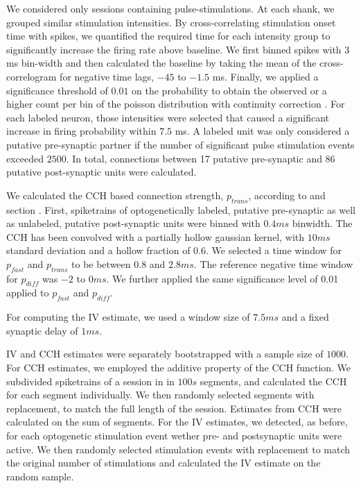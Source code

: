 \documentclass[11pt]{article}
\begin{document}
We considered only sessions containing pulse-stimulations.
At each shank, we grouped similar stimulation intensities.
By cross-correlating stimulation onset time with spikes, we quantified the required time for each intensity group to significantly increase the firing rate above baseline.
We first binned spikes with $3$ ms bin-width and then calculated the baseline by taking the mean of the cross-correlogram for negative time lags, $-45$ to $-1.5$ ms.
Finally, we applied a significance threshold of $0.01$ on the probability to obtain the observed or a higher count per bin of the poisson distribution with continuity correction \citep{abeles1982quantification}.
For each labeled neuron, those intensities were selected that caused a significant increase in firing probability within $7.5$ ms.
A labeled unit was only considered a putative pre-synaptic partner if the number of significant pulse stimulation events exceeded $2500$.
In total, connections between 17 putative pre-synaptic and 86 putative post-synaptic units were calculated.

We calculated the CCH based connection strength, $p_{trans}$, according to \citep{English2017} and section .
First, spiketrains of optogenetically labeled, putative pre-synaptic as well as unlabeled, putative post-synaptic units were binned with $0.4 ms$ binwidth.
The CCH has been convolved with a partially hollow gaussian kernel, with $10 ms$ standard deviation and a hollow fraction of $0.6$.
We selected a time window for $p_{fast}$ and $p_{trans}$ to be between $0.8$ and $2.8 ms$.
The reference negative time window for $p_{diff}$ was $-2$ to $0 ms$.
We further applied the same significance level of 0.01 applied to $p_{fast}$ and $p_{diff}$.

For computing the IV estimate, we used a window size of $7.5 ms$ and a fixed synaptic delay of $1 ms$.

IV and CCH estimates were separately bootstrapped with a sample size of $1000$.
For CCH estimates, we employed the additive property of the CCH function.
We subdivided spiketrains of a session in in $100 s$ segments, and calculated the CCH for each segment individually.
We then randomly selected segments with replacement, to match the full length of the session.
Estimates from CCH were calculated on the sum of segments.
For the IV estimates, we detected, as before, for each optogenetic stimulation event wether pre- and postsynaptic units were active.
We then randomly selected stimulation events with replacement to match the original number of stimulations and calculated the IV estimate on the random sample.
\end{document}
